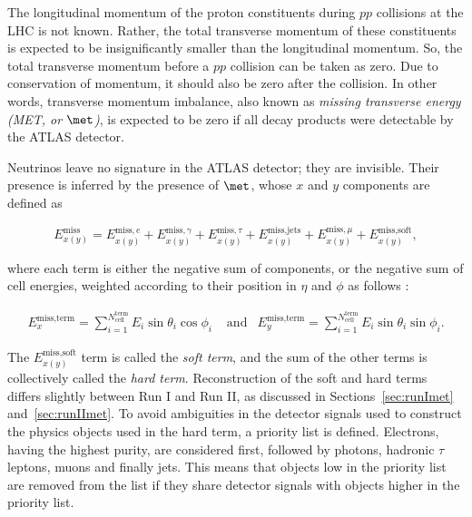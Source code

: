 \par The longitudinal momentum of the proton constituents during $pp$ collisions at the LHC 
is not known. Rather, the total transverse momentum of these constituents is expected to be 
insignificantly smaller than the longitudinal momentum. So, the total transverse momentum 
before a $pp$ collision can be taken as zero. Due to conservation of momentum, it should also 
be zero after the collision. In other words, transverse momentum imbalance, also known 
as {\it missing transverse energy (MET, or $\boldsymbol{\met}$)}, is expected to be zero if all decay products were 
detectable by the ATLAS detector.  

\par Neutrinos leave no signature in the ATLAS detector; they are invisible. 
Their presence is inferred by the presence of $\boldsymbol{\met}$, whose $x$ and $y$ components 
are defined as 

\begin{dmath}
E^{\text{miss}}_{x(y)} = E^{\text{miss},e}_{x(y)} + E^{\text{miss},\gamma}_{x(y)} +E^{\text{miss},\tau}_{x(y)} +E^{\text{miss,jets}}_{x(y)} + E^{\text{miss},\mu}_{x(y)} + E^{\text{miss,soft}}_{x(y)}, 
\label{eq:metDef}
\end{dmath} 

where each term is either the negative sum of \pt components, or the negative sum of cell energies, weighted according to their position in $\eta$ and $\phi$ as follows : 

\begin{equation}
\begin{aligned}
E^{\text{miss,term}}_{x} = \sum_{i=1}^{N^{\text{term}}_{\text{cell}}}E_i\sin\theta_i\cos\phi_i  & \text{ and} & 
E^{\text{miss,term}}_{y} = \sum_{i=1}^{N^{\text{term}}_{\text{cell}}}E_i\sin\theta_i\sin\phi_i.  
\end{aligned}
\end{equation}

The $E^{\text{miss,soft}}_{x(y)}$ term is called the {\it soft term}, and the sum of the other terms is collectively called 
the {\it hard term}. Reconstruction of the soft and hard terms differs slightly between 
Run I and Run II, as discussed in Sections~\ref{sec:runImet} and~\ref{sec:runIImet}.
To avoid ambiguities in the detector signals used to construct the physics objects used in the hard term, 
a priority list is defined. Electrons, having the highest purity, are considered first, followed by 
photons, hadronic $\tau$ leptons, muons and finally jets. This means that objects low in the 
priority list are removed from the list if they share detector signals with objects higher in the 
priority list.  

